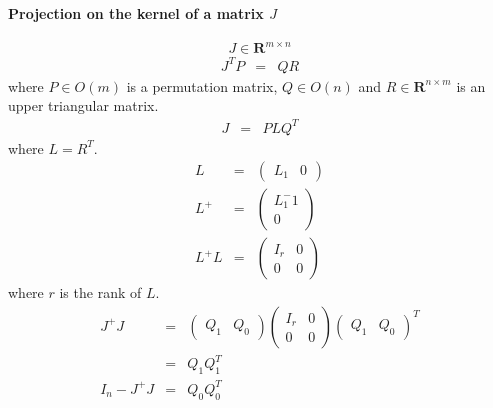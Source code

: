 \documentclass {article}
\newcommand\reals{\mathbf{R}}
\begin{document}
\paragraph {Projection on the kernel of a matrix $J$}
$$
J\in \reals^{m\times n}
$$
\begin{eqnarray*}
J^T P &=& QR
\end{eqnarray*}
where $P\in O(m)$ is a permutation matrix, $Q\in O(n)$ and $R\in\reals^{n\times m}$ is an upper triangular matrix.
\begin{eqnarray*}
J &=& PLQ^T
\end{eqnarray*}
where $L = R^T$.
\begin{eqnarray*}
L &=& \left(\begin{array}{cc} L_1 & 0 \end{array}\right)\\
L^+ &=& \left(\begin{array}{c} L_1^-1 \\ 0 \end{array}\right)\\
L^+ L &=& \left(\begin{array}{cc}
I_r & 0 \\
0 & 0 \end{array}\right)
\end{eqnarray*}
where $r$ is the rank of $L$.
\begin{eqnarray*}
J^+ J &=& \left(\begin{array}{cc} Q_1 & Q_0\end{array}\right)
\left(\begin{array}{cc} I_r & 0 \\ 0 & 0\end{array}\right)
\left(\begin{array}{cc} Q_1 & Q_0\end{array}\right)^T \\
&=& Q_1 Q_1^T\\
I_n - J^+ J &=& Q_0 Q_0^T
\end{eqnarray*}
\end{document}
